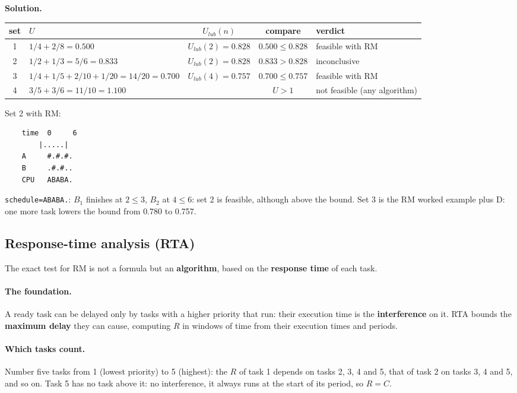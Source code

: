 \textbf{Solution.}
\begin{center}
    \begin{tabular}{c l c c l}
        \hline
        set & $U$ & $U_{lub}(n)$ & compare & verdict \\
        \hline
        1 & $1/4 + 2/8 = 0.500$ & $U_{lub}(2) = 0.828$ & $0.500 \le 0.828$ & feasible with RM \\
        2 & $1/2 + 1/3 = 5/6 = 0.833$ & $U_{lub}(2) = 0.828$ & $0.833 > 0.828$ & inconclusive \\
        3 & $1/4 + 1/5 + 2/10 + 1/20 = 14/20 = 0.700$ & $U_{lub}(4) = 0.757$ & $0.700 \le 0.757$ & feasible with RM \\
        4 & $3/5 + 3/6 = 11/10 = 1.100$ & & $U > 1$ & not feasible (any algorithm) \\
        \hline
    \end{tabular}
\end{center}
Set 2 with RM:
\begin{verbatim}
    time  0     6
        |.....|
    A     #.#.#.
    B     .#.#..
    CPU   ABABA.
\end{verbatim}
\texttt{schedule=ABABA.}: $B_1$ finishes at $2 \le 3$, $B_2$ at $4 \le 6$: set 2 is feasible, although above the bound. Set 3 is the RM worked example plus D: one more task lowers the bound from 0.780 to 0.757.

\subsection{Response-time analysis (RTA)}
The exact test for RM is not a formula but an \textbf{algorithm}, based on the \textbf{response time} of each task.

\paragraph{The foundation.} A ready task can be delayed only by tasks with a higher priority that run: their execution time is the \textbf{interference} on it. RTA bounds the \textbf{maximum delay} they can cause, computing $R$ in windows of time from their execution times and periods.

\paragraph{Which tasks count.} Number five tasks from 1 (lowest priority) to 5 (highest): the $R$ of task 1 depends on tasks 2, 3, 4 and 5, that of task 2 on tasks 3, 4 and 5, and so on. Task 5 has no task above it: no interference, it always runs at the start of its period, so $R = C$.

